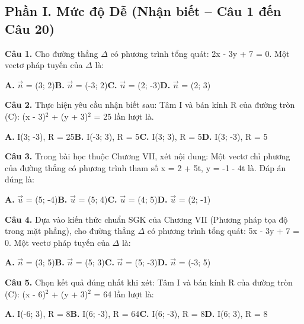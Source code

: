 \documentclass[11pt,a4paper]{article}
\begin{document}
\subsection*{\color{accent} Phần I. Mức độ Dễ (Nhận biết -- Câu 1 đến Câu 20)}
\textbf{\color{primary} Câu 1.} Cho đường thẳng $\Delta$ có phương trình tổng quát: 2x - 3y + 7 = 0. Một vectơ pháp tuyến của $\Delta$ là:\par
\hspace*{1.5em}\textbf{A.} $\vec{n}$ = (3; 2)\quad\quad \textbf{B.} $\vec{n}$ = (-3; 2)\quad\quad \textbf{C.} $\vec{n}$ = (2; -3)\quad\quad \textbf{D.} $\vec{n}$ = (2; 3)\par\vspace{2pt}
\textbf{\color{primary} Câu 2.} Thực hiện yêu cầu nhận biết sau: Tâm I và bán kính R của đường tròn (C): (x - 3)$^2$ + (y + 3)$^2$ = 25 lần lượt là.\par
\hspace*{1.5em}\textbf{A.} I(3; -3), R = 25\quad\quad \textbf{B.} I(-3; 3), R = 5\quad\quad \textbf{C.} I(3; 3), R = 5\quad\quad \textbf{D.} I(3; -3), R = 5\par\vspace{2pt}
\textbf{\color{primary} Câu 3.} Trong bài học thuộc Chương VII, xét nội dung: Một vectơ chỉ phương của đường thẳng có phương trình tham số x = 2 + 5t, y = -1 - 4t là. Đáp án đúng là:\par
\hspace*{1.5em}\textbf{A.} $\vec{u}$ = (5; -4)\quad\quad \textbf{B.} $\vec{u}$ = (5; 4)\quad\quad \textbf{C.} $\vec{u}$ = (4; 5)\quad\quad \textbf{D.} $\vec{u}$ = (2; -1)\par\vspace{2pt}
\textbf{\color{primary} Câu 4.} Dựa vào kiến thức chuẩn SGK của Chương VII (Phương pháp tọa độ trong mặt phẳng), cho đường thẳng $\Delta$ có phương trình tổng quát: 5x - 3y + 7 = 0. Một vectơ pháp tuyến của $\Delta$ là:\par
\hspace*{1.5em}\textbf{A.} $\vec{n}$ = (3; 5)\quad\quad \textbf{B.} $\vec{n}$ = (5; 3)\quad\quad \textbf{C.} $\vec{n}$ = (5; -3)\quad\quad \textbf{D.} $\vec{n}$ = (-3; 5)\par\vspace{2pt}
\textbf{\color{primary} Câu 5.} Chọn kết quả đúng nhất khi xét: Tâm I và bán kính R của đường tròn (C): (x - 6)$^2$ + (y + 3)$^2$ = 64 lần lượt là:\par
\hspace*{1.5em}\textbf{A.} I(-6; 3), R = 8\quad\quad \textbf{B.} I(6; -3), R = 64\quad\quad \textbf{C.} I(6; -3), R = 8\quad\quad \textbf{D.} I(6; 3), R = 8\par\vspace{2pt}
\end{document}
